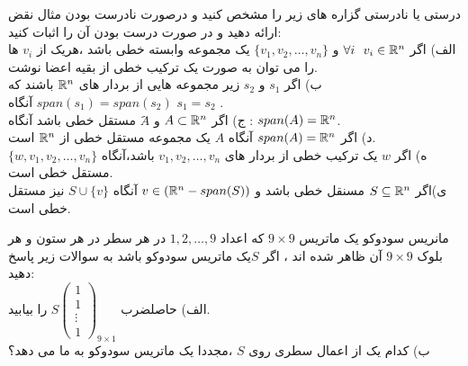 \documentclass{article}
\begin{document}
 درستی یا نادرستی گزاره های زیر را مشخص کنید و درصورت نادرست بودن مثال نقض ارائه دهید و در صورت درست بودن آن را اثبات کنید:
\\
الف) اگر 
$\forall i\ \ v_i\in {\Bbb R}^n$
و 
$\{v_1,v_2,\ldots,v_n \}$
یک مجموعه وابسته خطی باشد ،هریک از $v_i$ ها را می توان به صورت یک ترکیب خطی از بقیه اعضا نوشت.
\\
ب) اگر $s_1 $ و $s_2 $  زیر مجموعه هایی از بردار های 
${\Bbb R}^n$
باشند که 
$span(s_1)=span(s_2)$
آنگاه 
$s_1=s_2$
.
\\
ج) اگر
 $A\subset {\Bbb R}^n$
 و $َA$ مستقل خطی باشد آنگاه :
 $span(A)={\Bbb R}^n$.
 \\
 د) اگر 
 $span(A)={\Bbb R}^n$
 آنگاه $A$ یک مجموعه مستقل خطی از
 ${\Bbb R}^n$
 است.
 \\
 ه) اگر 
 $w$
 یک ترکیب خطی از بردار های 
 $v_1,v_2,\ldots,v_n$
 باشد،آنگاه 
 $\{w,v_1,v_2,\ldots,v_n\}$
 مستقل خطی است.
 \\
 ی)اگر 
 $S \subseteq {\Bbb R}^n$
 مسنقل خطی باشد و 
 $v \in ({{\Bbb R}^n}-span(S))$
 آنگاه 
 $S\cup \{v\}$
 نیز مستقل خطی است.
 
  مانریس سودوکو یک ماتریس 
 $9\times 9$
 که اعداد 
 $1,2,\ldots,9$
در هر سطر در هر ستون و هر بلوک 
$9\times 9$
آن ظاهر شده اند ، اگر $S$یک ماتریس سودوکو باشد به سوالات زیر پاسخ دهید:
\\
الف) حاصلضرب 
$S {\left(\begin{array}{ccc}
	1\\
	1\\
	\vdots\\
	1
\end{array}\right)_{9\times 1}}$
 را بیابید.
 \\
 ب)  کدام یک از اعمال سطری روی 
 $S$
 ،مجددا یک ماتریس سودوکو به ما می دهد؟
 
\end{document}

